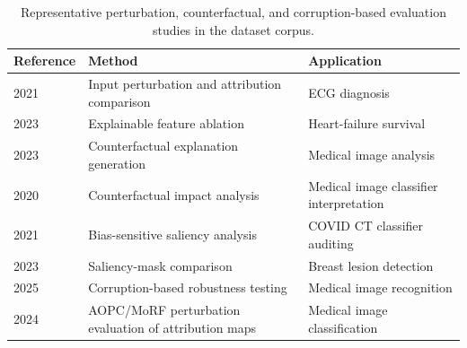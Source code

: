 \begin{table}[H]
\centering
\caption{Representative perturbation, counterfactual, and corruption-based evaluation studies in the dataset corpus.}
\label{tab:perturbation_methods}
\renewcommand{\arraystretch}{1.2}
\begin{tabular}{p{3.0cm} p{5.6cm} p{5.4cm}}
\hline
\textbf{Reference} & \textbf{Method} & \textbf{Application} \\
\hline
\cite{Zhang2021} 2021 & Input perturbation and attribution comparison & ECG diagnosis \\
\cite{MorenoSanchez2023} 2023 & Explainable feature ablation & Heart-failure survival \\
\cite{singla2023explaining} 2023 & Counterfactual explanation generation & Medical image analysis \\
\cite{lenis2020domain} 2020 & Counterfactual impact analysis & Medical image classifier interpretation \\
\cite{palatnik2021xai} 2021 & Bias-sensitive saliency analysis & COVID CT classifier auditing \\
\cite{Pertuz2023} 2023 & Saliency-mask comparison & Breast lesion detection \\
\cite{Repetto2025EvaluatingTR} 2025 & Corruption-based robustness testing & Medical image recognition \\
\cite{Patricio2024} 2024 & AOPC/MoRF perturbation evaluation of attribution maps & Medical image classification \\
\hline
\end{tabular}
\end{table}
